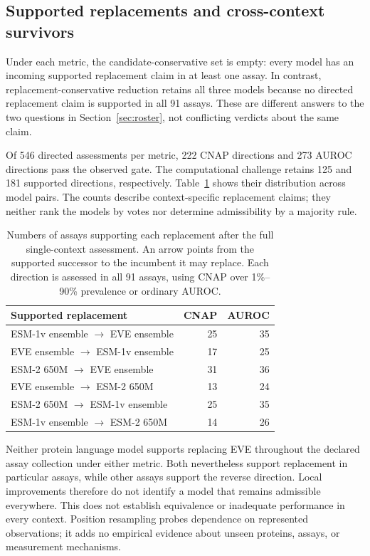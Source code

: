 \documentclass[11pt]{article}
\theoremstyle{remark}
\begin{document}
\subsection{Supported replacements and cross-context survivors}

Under each metric, the candidate-conservative set is empty: every model has
an incoming supported replacement claim in at least one assay. In contrast,
replacement-conservative reduction retains all three models because no
directed replacement claim is supported in all 91 assays. These are different
answers to the two questions in Section~\ref{sec:roster}, not conflicting
verdicts about the same claim.

Of 546 directed assessments per metric, 222 CNAP directions and 273 AUROC
directions pass the observed gate. The computational challenge retains 125
and 181 supported directions, respectively. Table~\ref{tab:proteingym-context-results}
shows their distribution across model pairs. The counts describe
context-specific replacement claims; they neither rank the models by votes
nor determine admissibility by a majority rule.

\begin{table}[htbp]
\centering
\caption{Numbers of assays supporting each replacement after the full
single-context assessment. An arrow points from the supported successor to
the incumbent it may replace. Each direction is assessed in all 91 assays,
using CNAP over 1\%--90\% prevalence or ordinary AUROC.}
\label{tab:proteingym-context-results}
\begin{tabular}{@{}lrr@{}}
\toprule
Supported replacement & CNAP & AUROC \\
\midrule
ESM-1v ensemble $\to$ EVE ensemble & 25 & 35 \\
EVE ensemble $\to$ ESM-1v ensemble & 17 & 25 \\
ESM-2 650M $\to$ EVE ensemble & 31 & 36 \\
EVE ensemble $\to$ ESM-2 650M & 13 & 24 \\
ESM-2 650M $\to$ ESM-1v ensemble & 25 & 35 \\
ESM-1v ensemble $\to$ ESM-2 650M & 14 & 26 \\
\bottomrule
\end{tabular}
\end{table}

Neither protein language model supports replacing EVE throughout the declared
assay collection under either metric. Both nevertheless support replacement
in particular assays, while other assays support the reverse direction.
Local improvements therefore do not identify a model that remains admissible
everywhere. This does not establish equivalence or inadequate performance in
every context. Position resampling probes dependence on represented observations;
it adds no empirical evidence about unseen proteins, assays, or measurement
mechanisms.
\end{document}
